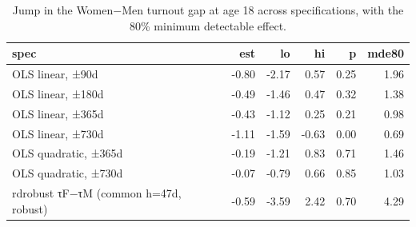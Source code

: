 \begin{table}
\caption{Jump in the Women$-$Men turnout gap at age 18 across specifications, with the 80\% minimum detectable effect.}
\label{tab:gap_jump_robustness}
\begin{tabular}{lrrrrr}
\toprule
spec & est & lo & hi & p & mde80 \\
\midrule
OLS linear, ±90d & -0.80 & -2.17 & 0.57 & 0.25 & 1.96 \\
OLS linear, ±180d & -0.49 & -1.46 & 0.47 & 0.32 & 1.38 \\
OLS linear, ±365d & -0.43 & -1.12 & 0.25 & 0.21 & 0.98 \\
OLS linear, ±730d & -1.11 & -1.59 & -0.63 & 0.00 & 0.69 \\
OLS quadratic, ±365d & -0.19 & -1.21 & 0.83 & 0.71 & 1.46 \\
OLS quadratic, ±730d & -0.07 & -0.79 & 0.66 & 0.85 & 1.03 \\
rdrobust τF−τM (common h=47d, robust) & -0.59 & -3.59 & 2.42 & 0.70 & 4.29 \\
\bottomrule
\end{tabular}
\end{table}
